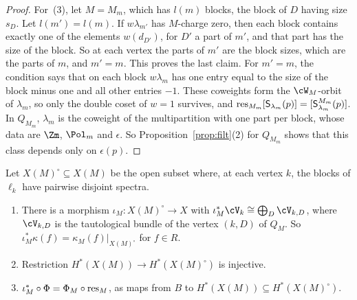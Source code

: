 \documentclass[11pt]{amsart}
\begin{document}
\begin{proof}
For~(3), let $M=M_m$, which has $l(m)$ blocks, the block of $D$ having size
$s_D$.  Let $l(m')=l(m)$.  If $w\lambda_{m'}$ has $M$-charge zero, then each
block contains exactly one of the elements $w(d_{D'})$, for $D'$ a part of
$m'$, and that part has the size of the block.  So at each vertex the parts of $m'$ are
the block sizes, which are the parts of $m$, and $m'=m$.  This proves the
last claim.  For $m'=m$, the condition says that on each block $w\lambda_m$
has one entry equal to the size of the block minus one and all other
entries $-1$.  These coweights form the $\cW_{M}$-orbit of $\lambda_m$, so only
the double coset of $w=1$ survives, and
$\operatorname{res}_{M_m}[\mathsf S_{\lambda_m}(p)]=[\mathsf S^{M_m}_{\lambda_m}(p)]$.  In
$Q_{M_m}$, $\lambda_m$ is the coweight of the multipartition with one part per
block, whose data are $\Zm$, $\Pol_m$ and $\epsilon$.  So
Proposition~\ref{prop:filt}(2) for $Q_{M_m}$ shows that this class depends
only on $\epsilon(p)$.
\end{proof}

\begin{lemma}[induction]\label{lem:ind}
Let $X(M)^\circ\subseteq X(M)$ be the open subset where, at each vertex $k$,
the blocks of $\ell_k$ have pairwise disjoint spectra.
\begin{enumerate}[leftmargin=2em]
\item There is a morphism $\iota_M\colon X(M)^\circ\to X$ with
$\iota_M^*\cV_k\cong\bigoplus_D\cV_{k,D}$, where $\cV_{k,D}$ is the tautological
bundle of the vertex $(k,D)$ of $Q_M$.  So
$\iota_M^*\kappa(f)=\kappa_M(f)|_{X(M)^\circ}$ for $f\in R$.
\item Restriction $H^*(X(M))\to H^*(X(M)^\circ)$ is injective.
\item $\iota_M^*\circ\Phi=\Phi_M\circ\operatorname{res}_M$, as maps from $B$ to
$H^*(X(M))\subseteq H^*(X(M)^\circ)$.
\end{enumerate}
\end{lemma}
\end{document}
